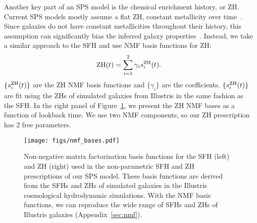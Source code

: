 Another key part of an SPS model is the chemical enrichment history, or ZH. 
Current SPS models mostly assume a flat ZH, constant metallicity over
time~\citep{carnall2019a, leja2019}.
Since galaxies do not have constant metallicities throughout their history,
this assumption can significantly bias the inferred galaxy
properties~\citep{thorne2021}. 
Instead, we take a similar approach to the SFH and use NMF basis functions for
ZH:
\begin{equation}
    {\rm ZH}(t) = \sum\limits_{i=1}^2 \gamma_i s_i^{\rm ZH}(t).
\end{equation} 
$\{s_i^{\rm ZH}(t)\}$ are the ZH NMF basis functions and $\{\gamma_i\}$ are the
coefficients. 
$\{s_i^{\rm ZH}(t)\}$ are fit using the ZHs of simulated galaxies from
Illustris in the same fashion as the SFH. 
In the right panel of Figure~\ref{fig:nmf}, we present the ZH NMF bases as a
function of lookback time. 
We use two NMF components, so our ZH prescription has 2 free parameters. 

\begin{figure}
\begin{center}
\texttt{[image: figs/nmf\_bases.pdf]} 
    \caption{
        Non-negative matrix factorization basis functions for the SFH (left)
        and ZH (right) used in the non-parametric SFH and ZH prescriptions of
        our SPS model. 
        These basis functions are derived from the SFHs and ZHs of simulated
        galaxies in the Illustris cosmological hydrodynamic simulations. 
        With the NMF basis functions, we can reproduce the wide range of SFHs
        and ZHs of Illustris galaxies (Appendix~\ref{sec:nmf}).  
    }
    \label{fig:nmf}
\end{center}
\end{figure}

